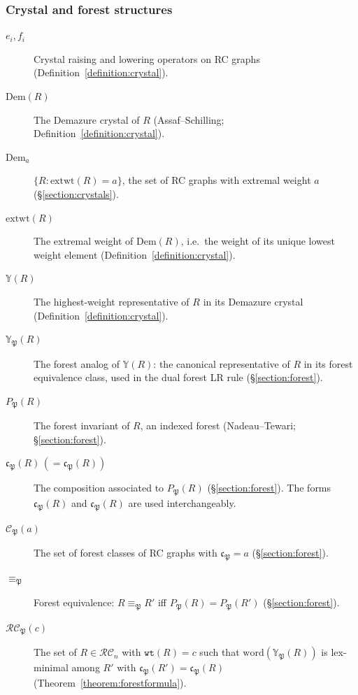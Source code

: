 \documentclass{amsart}
\theoremstyle{definition}
\theoremstyle{remark}
\numberwithin{equation}{subsection}
\newcommand{\wtt}{\mathtt{wt}}
\newcommand{\RC}{\mathcal{RC}}
\newcommand{\code}{\mathfrak{c}}
\newcommand{\forest}{\mathfrak{P}}
\newcommand{\fcode}{\mathfrak{c}_\forest}
\newcommand{\finv}{P_{\forest}}
\begin{document}
\subsubsection*{Crystal and forest structures}
\begin{description}
\item[$e_i,f_i$] Crystal raising and lowering operators on RC graphs (Definition~\ref{definition:crystal}).
\item[$\mathrm{Dem}(R)$] The Demazure crystal of $R$ (Assaf--Schilling; Definition~\ref{definition:crystal}).
\item[$\mathrm{Dem}_a$] $\{R:\mathrm{extwt}(R)=a\}$, the set of RC graphs with extremal weight $a$ (\S\ref{section:crystals}).
\item[$\mathrm{extwt}(R)$] The extremal weight of $\mathrm{Dem}(R)$, i.e.\ the weight of its unique lowest weight element (Definition~\ref{definition:crystal}).
\item[$\mathbb{Y}(R)$] The highest-weight representative of $R$ in its Demazure crystal (Definition~\ref{definition:crystal}).
\item[$\mathbb{Y}_\forest(R)$] The forest analog of $\mathbb{Y}(R)$: the canonical representative of $R$ in its forest equivalence class, used in the dual forest LR rule (\S\ref{section:forest}).
\item[$\finv(R)$] The forest invariant of $R$, an indexed forest (Nadeau--Tewari; \S\ref{section:forest}).
\item[$\fcode(R)\,(=\code_\forest(R))$] The composition associated to $\finv(R)$ (\S\ref{section:forest}). The forms $\fcode(R)$ and $\code_\forest(R)$ are used interchangeably.
\item[$\mathcal{C}_\forest(a)$] The set of forest classes of RC graphs with $\fcode=a$ (\S\ref{section:forest}).
\item[$\equiv_\forest$] Forest equivalence: $R\equiv_\forest R'$ iff $\finv(R)=\finv(R')$ (\S\ref{section:forest}).
\item[$\RC_\forest(c)$] The set of $R\in\RC_n$ with $\wtt(R)=c$ such that $\mathrm{word}(\mathbb{Y}_\forest(R))$ is lex-minimal among $R'$ with $\code_\forest(R')=\code_\forest(R)$ (Theorem~\ref{theorem:forestformula}).
\end{description}
\end{document}

